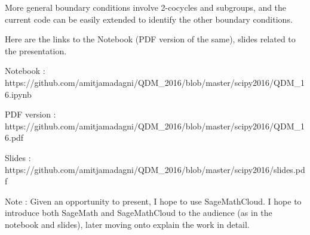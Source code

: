 \documentclass[a4paper,10pt]{article}
\begin{document}
More general boundary conditions involve 2-cocycles and subgroups, and the current code can be easily extended to identify the other boundary conditions.

Here are the links to the Notebook (PDF version of the same), slides related to the presentation. 

Notebook : https://github.com/amitjamadagni/QDM_2016/blob/master/scipy2016/QDM_16.ipynb

PDF version : https://github.com/amitjamadagni/QDM_2016/blob/master/scipy2016/QDM_16.pdf

Slides : https://github.com/amitjamadagni/QDM_2016/blob/master/scipy2016/slides.pdf

Note : Given an opportunity to present, I hope to use SageMathCloud. I hope to introduce both SageMath and SageMathCloud to the audience (as in the notebook and slides), later moving onto explain the work in detail.
\end{document}
